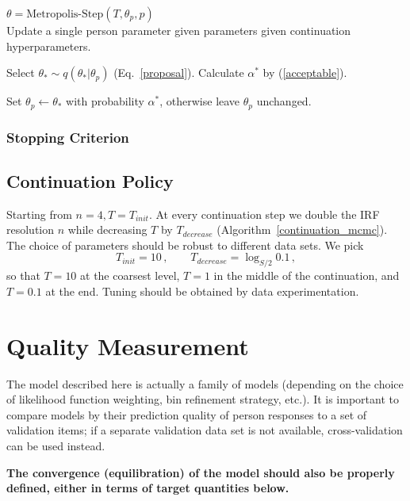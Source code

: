 \documentclass{article}
\newcommand{\ta}{\theta}
\begin{document}
\begin{algorithm}
\caption[]{$\ta = {\mbox{Metropolis-Step}}(T, \ta_p, p)$\\\hspace{\textwidth}
Update a single person parameter given parameters given continuation hyperparameters.}
\begin{algorithmic}
	\label{metropolis_step}
    \STATE Select $\ta_* \sim q(\ta_*|\ta_p)$ (Eq.~\ref{proposal}).
	\STATE Calculate $\alpha^*$ by (\ref{acceptable}).
	\item Set $\ta_p \leftarrow \ta_*$ with probability $\alpha^*$, otherwise leave $\ta_p$ unchanged.
\end{algorithmic}
\end{algorithm}

\subsubsection{Stopping Criterion}

\subsection{Continuation Policy}
Starting from $n = 4, T=T_{init}$. At every continuation step we double the IRF resolution $n$ while decreasing $T$ by $T_{decrease}$ (Algorithm~\ref{continuation_mcmc}). The choice of parameters should be robust to different data sets. We pick
\begin{equation}
	T_{init} = 10\,,\qquad T_{decrease} = \log_{S/2} 0.1\,,
\end{equation}
so that $T=10$ at the coarsest level, $T=1$ in the middle of the continuation, and $T=0.1$ at the end. Tuning should be obtained by data experimentation. 

\section{Quality Measurement}
The model described here is actually a family of models (depending on the choice of likelihood function weighting, bin refinement strategy, etc.). It is important to compare models by their prediction quality of
person responses to a set of validation items; if a separate validation data set is not available, cross-validation can be used instead.

{\bf The convergence (equilibration) of the model should also be properly defined, either in terms of target quantities below.}
\end{document}
